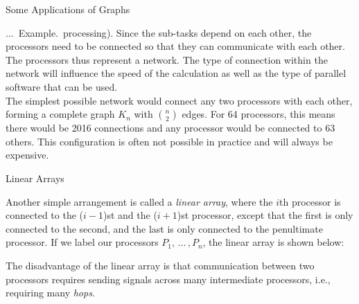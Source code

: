 \documentclass[smaller,hyperref={CJKbookmarks=true}]{beamer}
\newcounter{zhuo}[subsection]
\renewcommand{\thezhuo}{\thesection.\thesubsection.\arabic{zhuo}}
\newenvironment{EXAMPLE}{\stepcounter{zhuo}\alert{\!\thezhuo.~Example.\,}}{}
\begin{document}
\begin{frame}{Some Applications of Graphs}
\begin{spacing}{1.25}
\begin{EXAMPLE}
{processing}). Since the sub-tasks depend on each other, the processors
need to be connected so that they can communicate with each other. The
processors thus represent a network. The type of connection within the
network will influence the speed of the calculation as well as the type of
parallel software that can be used.\\[6pt]
The simplest possible network would connect any two processors with each
other, forming a complete graph $K_n$ with $\binom{n}{2}$ edges. For 64 processors,
this means there would be 2016 connections and any processor would be
connected to 63 others. This configuration is often not possible in practice
and will always be expensive.
\end{EXAMPLE}
\end{spacing}
\end{frame}
\begin{frame}[c]{Linear Arrays}
\begin{spacing}{1.1}
Another simple arrangement is called a \emph{linear array}, where the $i$th
processor is connected to the ($i-1$)st and the ($i + 1$)st processor, except
that the first is only connected to the second, and the last is only
connected to the penultimate processor. If we label our processors $P_1,\,...\,,P_n$, the linear array is shown below:\\[4pt]
\begin{center}
\end{center}
The disadvantage of the linear array is that communication between two
processors requires sending signals across many intermediate processors,
i.e., requiring many \emph{hops}.
\end{spacing}
\end{frame}
\end{document}
